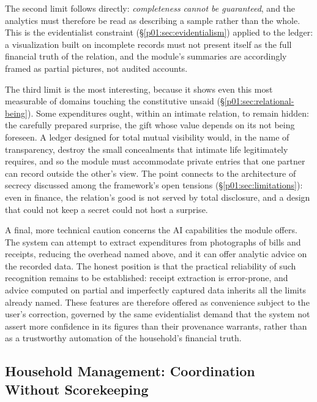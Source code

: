 The second limit follows directly: \emph{completeness cannot be guaranteed}, and the analytics must therefore be read as describing a sample rather than the whole. This is the evidentialist constraint (§\ref{p01:sec:evidentialism}) applied to the ledger: a visualization built on incomplete records must not present itself as the full financial truth of the relation, and the module's summaries are accordingly framed as partial pictures, not audited accounts.

The third limit is the most interesting, because it shows even this most measurable of domains touching the constitutive unsaid (§\ref{p01:sec:relational-being}). Some expenditures ought, within an intimate relation, to remain hidden: the carefully prepared surprise, the gift whose value depends on its not being foreseen. A ledger designed for total mutual visibility would, in the name of transparency, destroy the small concealments that intimate life legitimately requires, and so the module must accommodate private entries that one partner can record outside the other's view. The point connects to the architecture of secrecy discussed among the framework's open tensions (§\ref{p01:sec:limitations}): even in finance, the relation's good is not served by total disclosure, and a design that could not keep a secret could not host a surprise.

A final, more technical caution concerns the AI capabilities the module offers. The system can attempt to extract expenditures from photographs of bills and receipts, reducing the overhead named above, and it can offer analytic advice on the recorded data. The honest position is that the practical reliability of such recognition remains to be established: receipt extraction is error-prone, and advice computed on partial and imperfectly captured data inherits all the limits already named. These features are therefore offered as convenience subject to the user's correction, governed by the same evidentialist demand that the system not assert more confidence in its figures than their provenance warrants, rather than as a trustworthy automation of the household's financial truth.

\subsection{Household Management: Coordination Without Scorekeeping}\label{p01:sec:housework}

